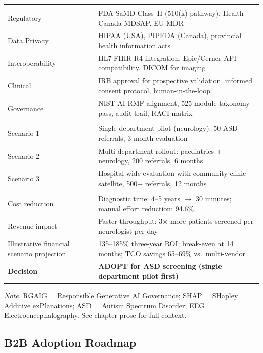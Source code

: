 {\begin{xltabular}{\textwidth}{@{} >{\raggedright\arraybackslash}p{2.5cm} L @{}}
\midrule
{} \\
\addlinespace
Regulatory & FDA SaMD Class~II (510(k) pathway), Health Canada MDSAP, EU MDR \\
Data Privacy & HIPAA (USA), PIPEDA (Canada), provincial health information acts \\
Interoperability & HL7 FHIR R4 integration, Epic/Cerner API compatibility, DICOM for imaging \\
Clinical & IRB approval for prospective validation, informed consent protocol, human-in-the-loop \\
Governance & NIST AI RMF alignment, 525-module taxonomy pass, audit trail, RACI matrix \\
\midrule
{} \\
\addlinespace
Scenario 1 & Single-department pilot (neurology): 50 ASD referrals, 3-month evaluation \\
Scenario 2 & Multi-department rollout: paediatrics + neurology, 200 referrals, 6 months \\
Scenario 3 & Hospital-wide evaluation with community clinic satellite, 500+ referrals, 12 months \\
\midrule
{} \\
\addlinespace
Cost reduction & Diagnostic time: 4--5 years $\to$ 30 minutes; manual effort reduction: 94.6\% \\
Revenue impact & Faster throughput: 3$\times$ more patients screened per neurologist per day \\
Illustrative financial scenario projection & 135--185\% three-year ROI; break-even at 14 months; TCO savings 65--69\% vs.\ multi-vendor \\
\midrule
\textbf{Decision} & \textbf{ADOPT for ASD screening (single department pilot first)} \\
\end{xltabular}}
\vspace{0.3em}\noindent\textit{Note.} RGAIG = Responsible Generative AI Governance; SHAP = SHapley Additive exPlanations; ASD = Autism Spectrum Disorder; EEG = Electroencephalography. See chapter prose for full context.

\subsection{B2B Adoption Roadmap}

